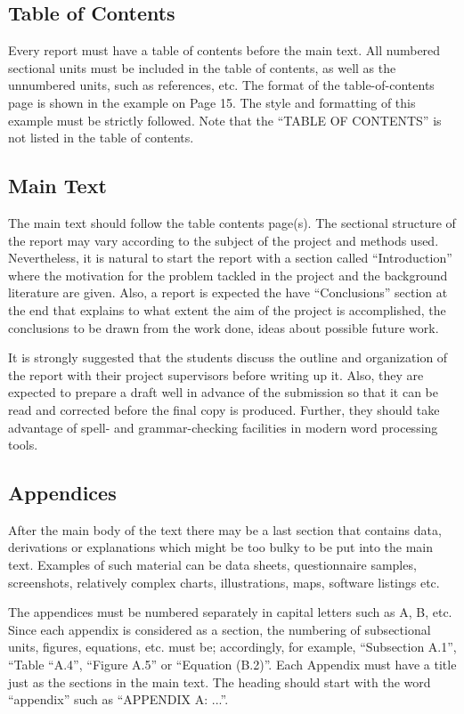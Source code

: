 \documentclass[12pt]{article} %
\numberwithin{equation}{section}
\numberwithin{figure}{section}
\numberwithin{table}{section}
\numberwithin{algorithm}{section}
\begin{document}
\subsection{Table of Contents}

Every report must have a table of contents before the main text. All numbered sectional units must be included in the table of contents, as well as the unnumbered units, such as references, etc. The format of the table-of-contents page is shown in the example on Page 15. The style and formatting of this example must be strictly followed. Note that the “TABLE OF CONTENTS” is not listed in the table of contents.

\subsection{Main Text}

The main text should follow the table contents page(s). The sectional structure of the report may vary according to the subject of the project and methods used. Nevertheless, it is natural to start the report with a section called “Introduction” where the motivation for the problem tackled in the project and the background literature are given. Also, a report is expected the have “Conclusions” section at the end that explains to what extent the aim of the project is accomplished, the conclusions to be drawn from the work done, ideas about possible future work.

It is strongly suggested that the students discuss the outline and organization of the report with their project supervisors before writing up it. Also, they are expected to prepare a draft well in advance of the submission so that it can be read and corrected before the final copy is produced. Further, they should take advantage of spell- and grammar-checking facilities in modern word processing tools.

\subsection{Appendices}

After the main body of the text there may be a last section that contains data, derivations or explanations which might be too bulky to be put into the main text. Examples of such material can be data sheets, questionnaire samples, screenshots, relatively complex charts, illustrations, maps, software listings etc.

The appendices must be numbered separately in capital letters such as A, B, etc. Since each appendix is considered as a section, the numbering of subsectional units, figures, equations, etc. must be; accordingly, for example, “Subsection A.1”, “Table “A.4”, “Figure A.5” or “Equation (B.2)”. Each Appendix must have a title just as the sections in the main text. The heading should start with the word “appendix” such as “APPENDIX A: ...”.
\end{document}
